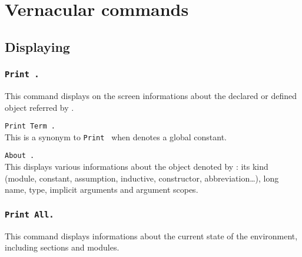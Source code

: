 \chapter{Vernacular commands}
\label{Vernacular-commands}
\label{Other-commands}

\section{Displaying}

\subsection{\tt Print {\qualid}.}
This command displays on the screen informations about the declared or
defined object referred by {\qualid}.

\begin{ErrMsgs}
\item {\qualid} 
\end{ErrMsgs}

\begin{Variants}
\item {\tt Print Term {\qualid}.}
\\ 
This is a synonym to {\tt Print {\qualid}} when {\qualid} denotes a
global constant. 

\item {\tt About {\qualid}.}
\label{About}
\\ 
This displays various informations about the object denoted by {\qualid}:
its kind (module, constant, assumption, inductive,
constructor, abbreviation\ldots), long name, type, implicit
arguments and argument scopes.

\end{Variants}

\subsection{\tt Print All.}
This command displays informations about the current state of the
environment, including sections and modules.

